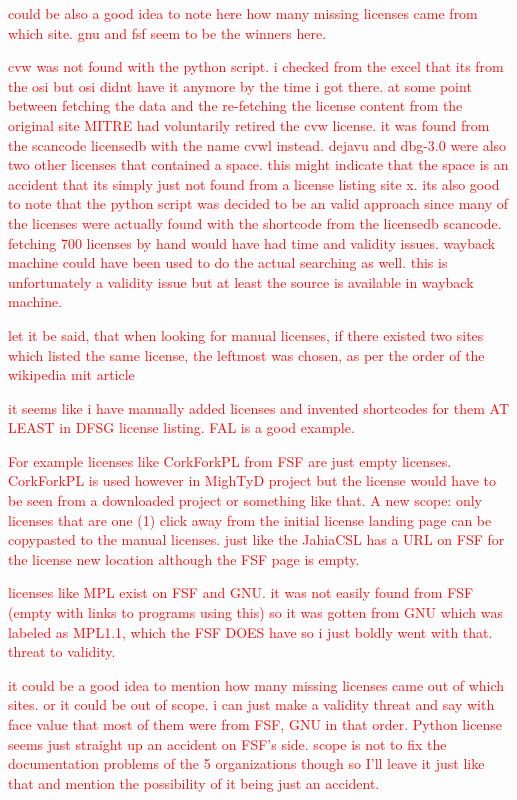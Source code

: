 \textcolor{red}{could be also a good idea to note here how many missing licenses came from which site. gnu and fsf seem to be the winners here.}

\textcolor{red}{cvw was not found with the python script. i checked from the excel that its from the osi but osi didnt have it anymore by the time i got there. at some point between fetching the data and the re-fetching the license content from the original site MITRE had voluntarily retired the cvw license. it was found from the scancode licensedb with the name cvwl instead. dejavu and dbg-3.0 were also two other licenses that contained a space. this might indicate that the space is an accident that its simply just not found from a license listing site x. its also good to note that the python script was decided to be an valid approach since many of the licenses were actually found with the shortcode from the licensedb scancode. fetching 700 licenses by hand would have had time and validity issues. wayback machine could have been used to do the actual searching as well. this is unfortunately a validity issue but at least the source is available in wayback machine.}

\textcolor{red}{let it be said, that when looking for manual licenses, if there existed two sites which listed the same license, the leftmost was chosen, as per the order of the wikipedia mit article}

\textcolor{red}{it seems like i have manually added licenses and invented shortcodes for them AT LEAST in DFSG license listing. FAL is a good example.}

\textcolor{red}{For example licenses like CorkForkPL from FSF are just empty licenses. CorkForkPL is used however in MighTyD project but the license would have to be seen from a downloaded project or something like that. A new scope: only licenses that are one (1) click away from the initial license landing page can be copypasted to the manual licenses. just like the JahiaCSL has a URL on FSF for the license new location although the FSF page is empty.}

\textcolor{red}{licenses like MPL exist on FSF and GNU. it was not easily found from FSF (empty with links to programs using this) so it was gotten from GNU which was labeled as MPL1.1, which the FSF DOES have so i just boldly went with that. threat to validity.}

\textcolor{red}{it could be a good idea to mention how many missing licenses came out of which sites. or it could be out of scope. i can just make a validity threat and say with face value that most of them were from FSF, GNU in that order. Python license seems just straight up an accident on FSF's side. scope is not to fix the documentation problems of the 5 organizations though so I'll leave it just like that and mention the possibility of it being just an accident.}


